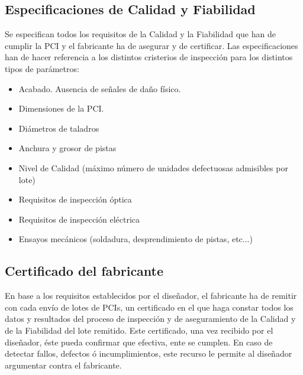 \subsection{Especificaciones de Calidad y Fiabilidad}
Se especifican todos los requisitos de la Calidad y la Fiabilidad que han de cumplir la PCI y el fabricante ha de asegurar y de certificar. Las especificaciones han de hacer referencia a los distintos cristerios de inspección para los distintos tipos de parámetros:
\begin{itemize}
    \item Acabado. Ausencia de señales de daño físico.
    \item Dimensiones de la PCI.
    \item Diámetros de taladros
    \item Anchura y grosor de pistas
    \item Nivel de Calidad (máximo número de unidades defectuosas admisibles por lote)
    \item Requisitos de inspección óptica
    \item Requisitos de inspección eléctrica
    \item Ensayos mecánicos (soldadura, desprendimiento de pistas, etc...)
\end{itemize}

\subsection{Certificado del fabricante}
En base a los requisitos establecidos por el diseñador, el fabricante ha de remitir con cada envío de lotes de PCIs, un certificado en el que haga constar todos los datos y resultados del proceso de inspección y de aseguramiento de la Calidad y de la Fiabilidad del lote remitido. Este certificado, una vez recibido por el diseñador, éste pueda confirmar que efectiva, ente se cumplen. En caso de detectar fallos, defectos ó incumplimientos, este recurso le permite al diseñador argumentar contra el fabricante.